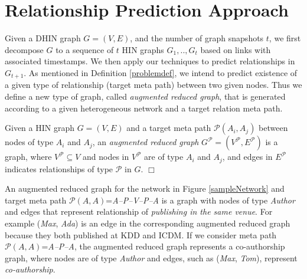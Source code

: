 \section{Relationship Prediction Approach}

Given a DHIN graph $G=(V,E)$, and the number of graph snapshots $t$, we first decompose $G$ to a sequence of $t$ HIN graphs ${G_1, .., G_t}$ based on links with associated timestamps. We then apply our techniques to predict relationships in $G_{t+1}$. As mentioned in Definition \ref{problemdef}, we intend to predict existence of a given type of relationship (target meta path) between two given nodes. Thus we define a new type of graph, called \textit{augmented reduced graph}, that is generated according to a given heterogeneous network and a target relation meta path. 


\begin{definition}\label{def:ARG}
Given a HIN graph $G=(V,E)$ and a target meta path $\mathcal{P}(A_i,A_j)$ between nodes of type $A_i$ and $A_j$, an \textit{augmented reduced graph} $G^\mathcal{P}=(V^\mathcal{P},E^\mathcal{P})$ is a graph, where $V^\mathcal{P} \subseteq V$ and nodes in $V^\mathcal{P}$ are of type $A_i$ and $A_j$, and edges in $E^\mathcal{P}$ indicates relationships of type $\mathcal{P}$ in $G$. $\Box$
\end{definition}


An augmented reduced graph for the network in Figure \ref{sampleNetwork} and target meta path $\mathcal{P}(A,A)$=\textit{A--P--V--P--A} is a graph with nodes of type \textit{Author} and edges that represent relationship of \textit{publishing in the same venue}. For example (\textit{Max}, \textit{Ada}) is an edge in the corresponding augmented reduced graph because they both published at KDD and ICDM. If we consider meta path $\mathcal{P}(A,A)$=\textit{A--P--A}, the augmented reduced graph represents a co-authorship graph, where nodes are of type \textit{Author} and edges, such as (\textit{Max}, \textit{Tom}), represent \textit{co-authorship}.  


